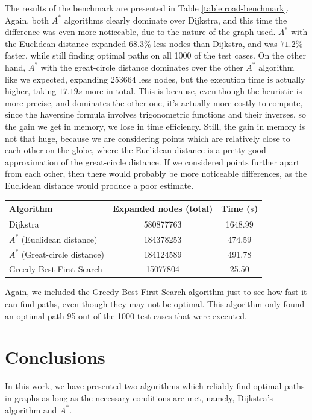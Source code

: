 \documentclass[a4paper,10pt]{report}
\begin{document}
The results of the benchmark are presented in Table \ref{table:road-benchmark}. Again, both $A^*$ algorithms clearly dominate over Dijkstra, and this time the difference was even more noticeable, due to the nature of the graph used. $A^*$ with the Euclidean distance expanded $68.3\%$ less nodes than Dijkstra, and was $71.2\%$ faster, while still finding optimal paths on all 1000 of the test cases. On the other hand, $A^*$ with the great-circle distance dominates over the other $A^*$ algorithm like we expected, expanding $253664$ less nodes, but the execution time is actually higher, taking $17.19 s$ more in total. This is because, even though the heuristic is more precise, and dominates the other one, it's actually more costly to compute, since the haversine formula involves trigonometric functions and their inverses, so the gain we get in memory, we lose in time efficiency. Still, the gain in memory is not that huge, because we are considering points which are relatively close to each other on the globe, where the Euclidean distance is a pretty good approximation of the great-circle distance. If we considered points further apart from each other, then there would probably be more noticeable differences, as the Euclidean distance would produce a poor estimate.

\begin{center}
	\begin{tabular}{lcc}
	\label{table:road-benchmark}
	Algorithm & Expanded nodes (total) & Time ($s$)  \\
	\hline
	Dijkstra & 580877763 & 1648.99 \\
	$A^*$ (Euclidean distance) & 184378253 & 474.59 \\
	$A^*$ (Great-circle distance) & 184124589 & 491.78 \\
	Greedy Best-First Search & 15077804 & 25.50 \\
	\end{tabular}
\end{center}

Again, we included the Greedy Best-First Search algorithm just to see how fast it can find paths, even though they may not be optimal. This algorithm only found an optimal path 95 out of the 1000 test cases that were executed.


\chapter{Conclusions}
In this work, we have presented two algorithms which reliably find optimal paths in graphs as long as the necessary conditions are met, namely, Dijkstra's algorithm and $A^*$.
\end{document}
